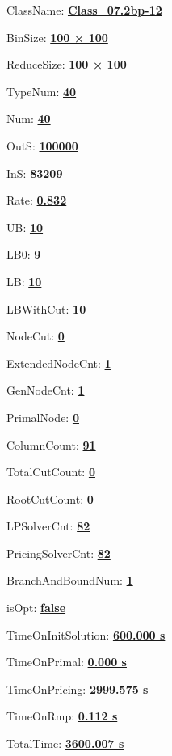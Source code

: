 \documentclass[11pt]{article}
\begin{document}
\pagestyle{empty}


ClassName: \underline{\textbf{Class_07.2bp-12}}
\par
BinSize: \underline{\textbf{100 × 100}}
\par
ReduceSize: \underline{\textbf{100 × 100}}
\par
TypeNum: \underline{\textbf{40}}
\par
Num: \underline{\textbf{40}}
\par
OutS: \underline{\textbf{100000}}
\par
InS: \underline{\textbf{83209}}
\par
Rate: \underline{\textbf{0.832}}
\par
UB: \underline{\textbf{10}}
\par
LB0: \underline{\textbf{9}}
\par
LB: \underline{\textbf{10}}
\par
LBWithCut: \underline{\textbf{10}}
\par
NodeCut: \underline{\textbf{0}}
\par
ExtendedNodeCnt: \underline{\textbf{1}}
\par
GenNodeCnt: \underline{\textbf{1}}
\par
PrimalNode: \underline{\textbf{0}}
\par
ColumnCount: \underline{\textbf{91}}
\par
TotalCutCount: \underline{\textbf{0}}
\par
RootCutCount: \underline{\textbf{0}}
\par
LPSolverCnt: \underline{\textbf{82}}
\par
PricingSolverCnt: \underline{\textbf{82}}
\par
BranchAndBoundNum: \underline{\textbf{1}}
\par
isOpt: \underline{\textbf{false}}
\par
TimeOnInitSolution: \underline{\textbf{600.000 s}}
\par
TimeOnPrimal: \underline{\textbf{0.000 s}}
\par
TimeOnPricing: \underline{\textbf{2999.575 s}}
\par
TimeOnRmp: \underline{\textbf{0.112 s}}
\par
TotalTime: \underline{\textbf{3600.007 s}}
\par
\newpage


\end{document}
